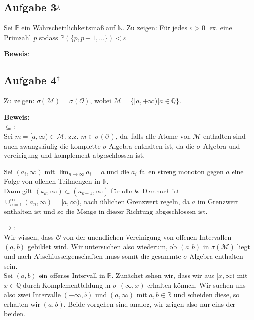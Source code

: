 \documentclass[11pt,a4paper,ngerman]{article}
\newcommand{\set}[1]{ \{ #1 \}}
\newcommand{\Prob}{\mathbb{P}}
\begin{document}
\subsection*{Aufgabe 3$^\curlywedgedownarrow$}
Sei $\Prob$ ein Wahrscheinlichkeitsmaß auf $\mathbb{N}$. Zu zeigen: Für jedes $\varepsilon > 0 \; $ ex. eine Primzahl $p$ sodass $\Prob(\set{p,p+1,\ldots}) < \varepsilon$.

\textbf{Beweis}: \\



\subsection*{Aufgabe 4$^\dagger$}
Zu zeigen: $\sigma(\mathcal{M}) = \sigma(\mathcal{O})$, wobei $\mathcal{M} = \set{[a, +\infty) | a \in \mathbb{Q}}$.

\textbf{Beweis:}\\

$\subseteq$:\\

Sei $m = [ a, \infty) \in \mathcal{M}$. z.z. $m \in \sigma (\mathcal{O})$,
da, falls alle Atome von $\mathcal{M}$ enthalten sind auch zwangsläufig die
komplette $\sigma$-Algebra enthalten ist, da die $\sigma$-Algebra und vereinigung und komplement abgeschlossen ist.


Sei $(a_i, \infty)$ mit $\lim_{n\rightarrow \infty} a_i = a$ und die $a_i$ fallen streng monoton gegen $a$ eine
Folge von offenen Teilmengen in $\mathbb{R}$.\\
Dann gilt $(a_k, \infty) \subset (a_{k+1}, \infty)$ für alle $k$.
Demnach ist $\cup_{n=1}^\infty (a_n, \infty) = [a, \infty)$, nach üblichen
Grenzwert regeln, da $a$ im Grenzwert enthalten ist und so die Menge in dieser
Richtung abgeschlossen ist.

$\supseteq$:\\

Wir wissen, dass $\mathcal{O}$ von der unendlichen Vereinigung von 
offenen Intervallen $(a,b)$ gebildet wird. Wir untersuchen also wiederum, ob
$(a,b)$ in $\sigma(\mathcal{M})$ liegt und nach Abschlusseigenschaften muss
somit die gesammte $\sigma$-Algebra enthalten sein.\\

Sei $(a,b)$ ein offenes Intervall in $\mathbb{R}$. Zunächst sehen wir,
dass wir aus $[x, \infty)$ mit $x \in \mathbb{Q}$ durch Komplementbildung in $\sigma$ $(\infty, x)$ erhalten können.
Wir suchen uns also zwei Intervalle $(-\infty, b)$ und $(a, \infty)$ mit $a,b \in \mathbb{R}$ und scheiden diese, so erhalten wir $(a,b)$. Beide vorgehen sind
analog, wir zeigen also nur eins der beiden.
\end{document}
